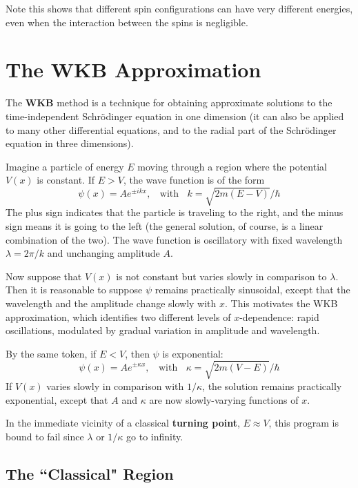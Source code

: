 \documentclass[12pt, a4paper, oneside, openright, titlepage]{book}
\begin{document}
Note this shows that different spin configurations can have very different energies, even when the interaction between the spins is negligible.



\chapter{The WKB Approximation}


The \textbf{WKB} method is a technique for obtaining approximate solutions to the time-independent Schr\"{o}dinger equation in one dimension (it can also be applied to many other differential equations, and to the radial part of the Schr\"{o}dinger equation in three dimensions).

\begin{rmk}[Idea]
    Imagine a particle of energy $E$ moving through a region where the potential $V(x)$ is constant. If $E > V$, the wave function is of the form $$\psi(x) = Ae^{\pm ikx},\;\;\text{ with }\;\;k = \sqrt{2m(E-V)}/\hbar$$
    The plus sign indicates that the particle is traveling to the right, and the minus sign means it is going to the left (the general solution, of course, is a linear combination of the two). The wave function is oscillatory with fixed wavelength $\lambda = 2\pi/k$ and unchanging amplitude $A$. 

    Now suppose that $V(x)$ is not constant but varies slowly in comparison to $\lambda$. Then it is reasonable to suppose $\psi$ remains practically sinusoidal, except that the wavelength and the amplitude change slowly with $x$. This motivates the WKB approximation, which identifies two different levels of $x$-dependence: rapid oscillations, modulated by gradual variation in amplitude and wavelength.

    By the same token, if $E < V$, then $\psi$ is exponential: $$\psi(x) = Ae^{\pm \kappa x},\;\;\text{ with }\;\;\kappa = \sqrt{2m(V-E)}/\hbar$$
    If $V(x)$ varies slowly in comparison with $1/\kappa$, the solution remains practically exponential, except that $A$ and $\kappa$ are now slowly-varying functions of $x$. 
\end{rmk}

In the immediate vicinity of a classical \textbf{turning point}, $E \approx V$, this program is bound to fail since $\lambda$ or $1/\kappa$ go to infinity.


\section{The ``Classical" Region}
\end{document}
